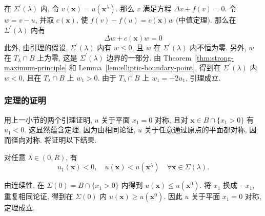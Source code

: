 \begin{Proof}
在 $\Sigma^{\prime}(\lambda)$ 内, 令 $v(\bm{x})=u(\bm{x}^\lambda)$. 那么 $v$ 满足方程 $\Delta v+f(v)=0$. 令 $w=v-u$, 并取 $c(\bm{x})$, 使 $f(v)-f(u)=c(\bm{x})w$ (中值定理). 那么在 $\Sigma^{\prime}(\lambda)$ 内有
\begin{equation}\label{eq:radial-reflection-difference-equation}
\Delta w+c(\bm{x})w=0
\end{equation}
此外, 由引理的假设, $\Sigma^{\prime}(\lambda)$ 内有 $w\leq0$, 且 $w$ 在 $\Sigma^{\prime}(\lambda)$ 内不恒为零. 另外, $w$ 在 $T_\lambda\cap B$ 上为零, 这是 $\Sigma^{\prime}(\lambda)$ 边界的一部分. 由 Theorem~\ref{thm:strong-maximum-principle} 和 Lemma~\ref{lem:elliptic-boundary-point}, 得到在 $\Sigma^{\prime}(\lambda)$ 内 $w<0$, 且在 $T_\lambda\cap B$ 上 $w_1>0$. 由于 $T_\lambda\cap B$ 上 $w_1=-2u_1$, 引理成立.
\end{Proof}

\subsubsection{定理的证明}\label{subsec:radial-symmetry-theorem-proof}

用上一小节的两个引理证明, $u$ 关于平面 $x_1=0$ 对称, 且对 $\bm{x}\in B\cap\{x_1>0\}$ 有 $u_1<0$. 这显然蕴含定理, 因为由相同论证, $u$ 关于任意通过原点的平面都对称, 因而径向对称. 将证明以下结果.

\begin{Lemma}
\label{lem:moving-plane-comparison}
对任意 $\lambda\in(0,R)$, 有
\begin{equation}\label{eq:moving-plane-strict-comparison}
u_1(\bm{x})<0,\quad u(\bm{x})<u(\bm{x}^\lambda)\quad\forall\bm{x}\in\Sigma(\lambda).
\end{equation}

\end{Lemma}

由连续性, 在 $\Sigma(0)=B\cap\{x_1>0\}$ 内得到 $u(\bm{x})\leq u(\bm{x}^0)$. 将 $x_1$ 换成 $-x_1$, 重复相同论证, 得到在 $\Sigma(0)$ 内 $u(\bm{x})\geq u(\bm{x}^0)$. 因此 $u$ 关于平面 $x_1=0$ 对称, 定理成立.

